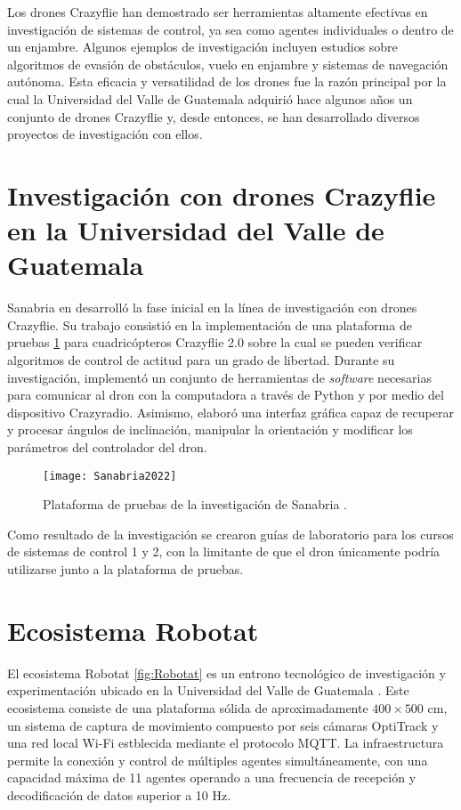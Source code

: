 Los drones Crazyflie han demostrado ser herramientas altamente efectivas en investigación de sistemas de control, ya sea como agentes individuales o dentro de un enjambre. Algunos ejemplos de investigación incluyen estudios sobre algoritmos de evasión de obstáculos, vuelo en enjambre y sistemas de navegación autónoma. Esta eficacia y versatilidad de los drones fue la razón principal por la cual la Universidad del Valle de Guatemala adquirió hace algunos años un conjunto de drones Crazyflie y, desde entonces, se han desarrollado diversos proyectos de investigación con ellos.

\section{Investigación con drones Crazyflie en la Universidad del Valle de Guatemala}
Sanabria en \cite{Sanabria2022_tesis} desarrolló la fase inicial en la línea de investigación con drones Crazyflie. Su trabajo consistió en la implementación de una plataforma de pruebas \ref{fig:Sanabria2022} para cuadricópteros Crazyflie 2.0 sobre la cual se pueden verificar algoritmos de control de actitud para un grado de libertad. Durante su investigación, implementó un conjunto de herramientas de \textit{software} necesarias para comunicar al dron con la computadora a través de Python y por medio del dispositivo Crazyradio. Asimismo, elaboró una interfaz gráfica capaz de recuperar y procesar ángulos de inclinación, manipular la orientación y modificar los parámetros del controlador del dron. 

\begin{figure}[htbp]
	\centering
	\texttt{[image: Sanabria2022]}
	\caption{Plataforma de pruebas de la investigación de Sanabria \cite{Sanabria2022_tesis}.}
	\label{fig:Sanabria2022}
\end{figure}

Como resultado de la investigación se crearon guías de laboratorio para los cursos de sistemas de control 1 y 2, con la limitante de que el dron únicamente podría utilizarse junto a la plataforma de pruebas.

\section{Ecosistema Robotat}
El ecosistema Robotat \ref{fig:Robotat} es un entrono tecnológico de investigación y experimentación ubicado en la Universidad del Valle de Guatemala \cite{Parafan2022_tesis}. Este ecosistema consiste de una plataforma sólida de aproximadamente $400\times 500$ cm, un sistema de captura de movimiento compuesto por seis cámaras OptiTrack y una red local Wi-Fi estblecida mediante el protocolo MQTT. La infraestructura permite la conexión y control de múltiples agentes simultáneamente, con una capacidad máxima de 11 agentes operando a una frecuencia de recepción y decodificación de datos superior a 10 Hz. 

